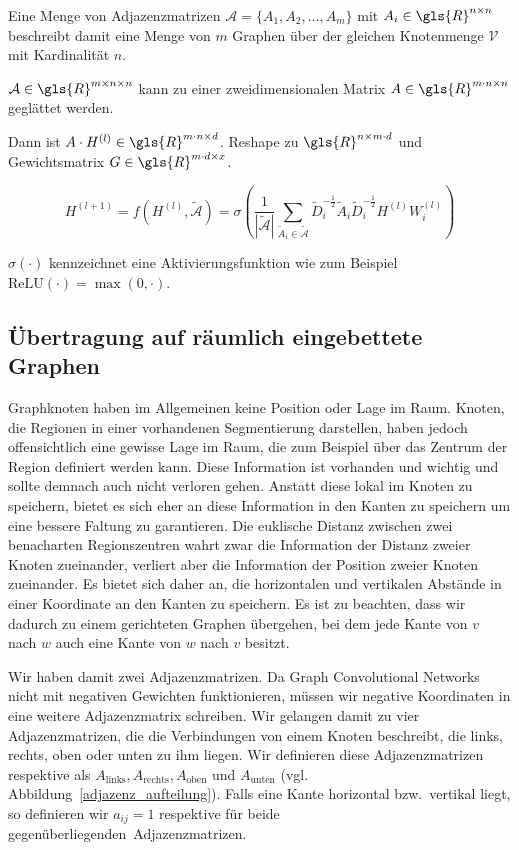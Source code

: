 Eine Menge von Adjazenzmatrizen $\mathcal{A} = \lbrace A_1, A_2, \ldots, A_m \rbrace$ mit $A_i \in \gls{R}^{n \times n}$ beschreibt damit eine Menge von $m$ Graphen über der gleichen Knotenmenge $\mathcal{V}$ mit Kardinalität $n$.

$\mathcal{A} \in \gls{R}^{m \times n \times n}$ kann zu einer zweidimensionalen Matrix $A \in \gls{R}^{m \cdot n \times n}$ geglättet werden.

Dann ist $A \cdot H^{(l)} \in \gls{R}^{m \cdot n \times d}$.
Reshape zu $\gls{R}^{n \times m \cdot d}$ und Gewichtsmatrix $G \in \gls{R}^{m \cdot d \times x}$.

\begin{equation}
  H^{(l+1)} = f(H^{(l)}, \mathcal{\tilde A}) = \sigma \left( \frac{1}{|\mathcal{\tilde A}|} \sum_{\tilde A_i \in \mathcal{\tilde A}} \tilde D_i^{-\frac{1}{2}} \tilde A_i \tilde D_i^{-\frac{1}{2}} H^{(l)} W^{(l)}_i \right)
\end{equation}

$\sigma(\cdot)$ kennzeichnet eine Aktivierungsfunktion wie zum Beispiel $\text{ReLU}(\cdot) = \max(0, \cdot)$.

\subsection{Übertragung auf räumlich eingebettete Graphen}

Graphknoten haben im Allgemeinen keine Position oder Lage im Raum.
Knoten, die Regionen in einer vorhandenen Segmentierung darstellen, haben jedoch offensichtlich eine gewisse Lage im Raum, die zum Beispiel über das Zentrum der Region definiert werden kann.
Diese Information ist vorhanden und wichtig und sollte demnach auch nicht verloren gehen.
Anstatt diese lokal im Knoten zu speichern, bietet es sich eher an diese Information in den Kanten zu speichern um eine bessere Faltung zu garantieren.
Die euklische Distanz zwischen zwei benacharten Regionszentren wahrt zwar die Information der Distanz zweier Knoten zueinander, verliert aber die Information der Position zweier Knoten zueinander.
Es bietet sich daher an, die horizontalen und vertikalen Abstände in einer Koordinate an den Kanten zu speichern.
Es ist zu beachten, dass wir dadurch zu einem gerichteten Graphen übergehen, bei dem jede Kante von $v$ nach $w$ auch eine Kante von $w$ nach $v$ besitzt.

Wir haben damit zwei Adjazenzmatrizen.
Da Graph Convolutional Networks nicht mit negativen Gewichten funktionieren, müssen wir negative Koordinaten in eine weitere Adjazenzmatrix schreiben.
Wir gelangen damit zu vier Adjazenzmatrizen, die die Verbindungen von einem Knoten beschreibt, die links, rechts, oben oder unten zu ihm liegen.
Wir definieren diese Adjazenzmatrizen respektive als $A_{\text{links}}, A_{\text{rechts}}, A_{\text{oben}}$ und $A_{\text{unten}}$ (vgl. Abbildung~\ref{adjazenz_aufteilung}).
Falls eine Kante horizontal bzw.\ vertikal liegt, so definieren wir $a_{ij} = 1$ respektive für beide \glqq{}gegenüberliegenden\grqq\ Adjazenzmatrizen.

